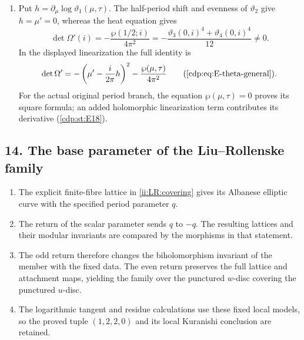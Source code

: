 \begin{enumerate}[label=\arabic*.,leftmargin=*]
and preserves its Kodaira--Spencer rank
(\ref{cdp:st:E18}).
\item Put $h=\partial_\mu\log\vartheta_1(\mu,\tau)$.
The half-period shift and evenness of $\vartheta_2$ give
$h=\mu'=0$, whereas the heat equation gives
\[
 \det\Omega'(i)=-\frac{\wp(1/2;i)}{4\pi^2}
 =-\frac{\vartheta_3(0,i)^4+\vartheta_4(0,i)^4}{12}\ne0.
\]
In the displayed linearization the full identity is
\[
 \det\Omega'
 =-\left(\mu'-\frac{i}{2\pi}h\right)^2
       -\frac{\wp(\mu,\tau)}{4\pi^2}
 \qquad\text{(\ref{cdp:eq:E-theta-general}).}
\]
For the actual original period branch, the equation
$\wp(\mu,\tau)=0$ proves its square formula; an added
holomorphic linearization term contributes its derivative
(\ref{cdp:st:E18}).
\end{enumerate}

\subsection*{14. The base parameter of the Liu--Rollenske family}
\RungOne
\begin{enumerate}[label=\arabic*.,leftmargin=*]
\item The explicit finite-fibre lattice in
\ref{ii:LR:covering} gives its Albanese elliptic curve with the
specified period parameter $q$.
\item The return of the scalar parameter sends $q$ to $-q$.
The resulting lattices and their modular invariants are compared
by the morphisms in that statement.
\item The odd return therefore changes the biholomorphism
invariant of the member with the fixed data.  The even return
preserves the full lattice and attachment maps, yielding the
family over the punctured $w$-disc covering the punctured $u$-disc.
\item The logarithmic tangent and residue calculations use these
fixed local models, so the proved tuple $(1,2,2,0)$ and its
local Kuranishi conclusion are retained.
\end{enumerate}

